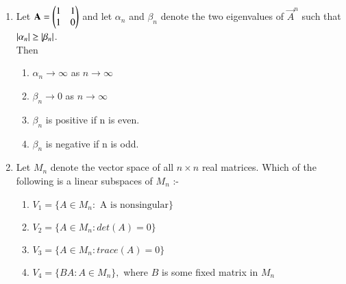 \renewcommand{\theequation}{\theenumi}
\renewcommand{\thefigure}{\theenumi}
\renewcommand{\thetable}{\theenumi}
\begin{enumerate}[label=\thesection.\arabic*.,ref=\thesection.\theenumi]

\item %
Let $\mathbf{A}=\begin{pmatrix}1 & 1\\1 & 0\end{pmatrix}$ and let $\alpha_n$ and $\beta_n$ denote the two eigenvalues of $\vec{A}^n$ such that $\left\vert\alpha_n\right\vert\geq\left\vert\beta_n\right\vert$.\\
Then
\begin{enumerate}
    \item $\alpha_n\rightarrow \infty$ as $n\rightarrow \infty$
    \item $\beta_n\rightarrow 0$ as $n\rightarrow \infty$
    \item $\beta_n$ is positive if n is even.
    \item $\beta_n$ is negative if n is odd.
\end{enumerate}
%
\solution

\item Let $M_n$ denote the vector space of all $n\times n$ real matrices. Which of the following is a linear subspaces of $M_n$ :-
\begin{enumerate}
\item $ V_1 = \{  A \in M_n : \text{ A is nonsingular} \}$
\item $ V_2 = \{  A \in M_n : det(A) = 0 \}$
\item $ V_3 = \{  A \in M_n : trace(A) = 0 \}$
\item $ V_4 = \{  BA : A \in M_n\},$ where $ B$ is some fixed matrix in $ M_n$
\end{enumerate}
%
\solution



\end{enumerate}
